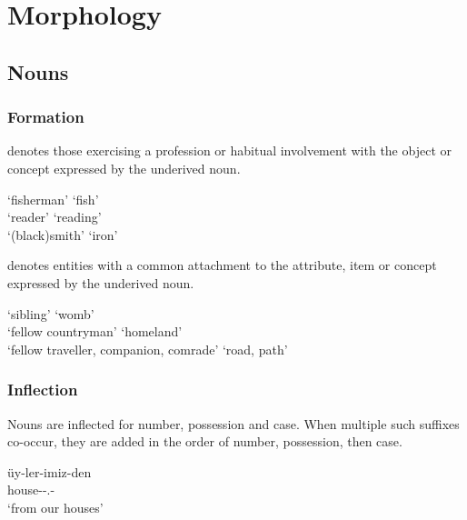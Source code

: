 \part{Morphology}

\chapter{Nouns}

\section{Formation}

 denotes those exercising a profession or habitual involvement with the object or concept expressed by the underived noun.

\begin{lingexample}
	\ex {} `fisherman' \derivedfrom{}  `fish' \\
		 `reader' \derivedfrom{}  `reading' \\
		 `(black)smith' \derivedfrom{}  `iron'
\end{lingexample}

 denotes entities with a common attachment to the attribute, item or concept expressed by the underived noun.

\begin{lingexample}
	\ex {} `sibling' \derivedfrom{}  `womb' \\
		 `fellow countryman' \derivedfrom{}  `homeland' \\
		 `fellow traveller, companion, comrade' \derivedfrom{}  `road, path'
\end{lingexample}

\section{Inflection}

Nouns are inflected for number, possession and case.
When multiple such suffixes co-occur, they are added in the order of number, possession, then case.

\begin{lingexample}
	\ex \gll üy-ler-imiz-den \\
		house-\Pl{}-\Poss{}.\Fpl{}-\Abl{} \\
		\glt `from our houses'
\end{lingexample}

